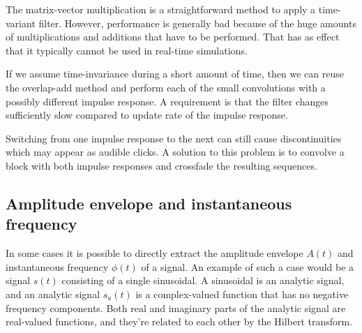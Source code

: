 The matrix-vector multiplication is a straightforward method to apply a
time-variant filter. However, performance is generally bad because of the huge
amounts of multiplications and additions that have to be performed. That has as
effect that it typically cannot be used in real-time simulations.

If we assume time-invariance during a short amount of time, then we can reuse
the overlap-add method and perform each of the small convolutions with a
possibly different impulse response. A requirement is that the filter changes
sufficiently slow compared to update rate of the impulse response.

Switching from one impulse response to the next can still cause discontinuities
which may appear as audible clicks. A solution to this problem is to convolve a block
with both impulse responses and crossfade the resulting sequences.




\subsection{Amplitude envelope and instantaneous frequency}
In some cases it is possible to directly extract the amplitude envelope $A(t)$
and instantaneous frequency $\phi(t)$ of a signal. An example of such a case
would be a signal $s(t)$ consisting of a single sinusoidal. A sinusoidal is an
analytic signal, and an analytic signal $s_a(t)$ is a complex-valued function
that has no negative frequency components. Both real and imaginary parts of the
analytic signal are real-valued functions, and they're related to each other by
the Hilbert transform.

